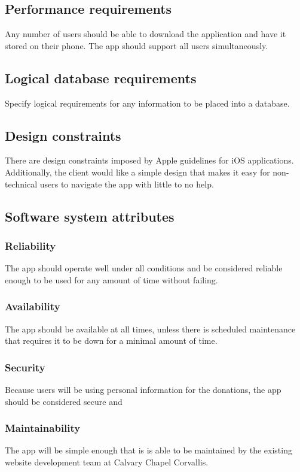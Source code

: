 \documentclass[letterpaper,10pt,draftclsnofoot,onecolumn,titlepage]{IEEEtran}
\begin{document}
	\subsection{Performance requirements}
	Any number of users should be able to download the application and have it stored on their phone.
	The app should support all users simultaneously.

	\subsection{Logical database requirements}
	Specify logical requirements for any information to be placed into a database.

	\subsection{Design constraints}
	There are design constraints imposed by Apple guidelines for iOS applications.
	Additionally, the client would like a simple design that makes it easy for non-technical users to navigate the app with little to no help.

	\subsection{Software system attributes}
	\subsubsection{Reliability} The app should operate well under all conditions and be considered reliable enough to be used for any amount of time without failing.
	\subsubsection{Availability} The app should be available at all times, unless there is scheduled maintenance that requires it to be down for a minimal amount of time.
	\subsubsection{Security} Because users will be using personal information for the donations, the app should be considered secure and
	\subsubsection{Maintainability} The app will be simple enough that is is able to be maintained by the existing website development team at Calvary Chapel Corvallis.
\end{document}
